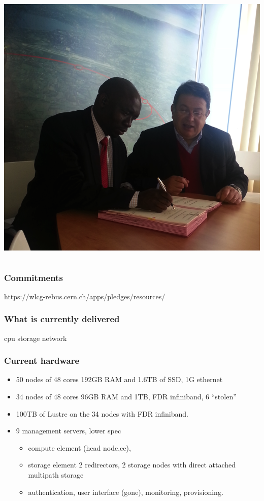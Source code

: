 \documentclass{beamer}
\begin{document}
\begin{frame}
\begin{columns}[T]
\begin{column}{.48\textwidth}
{\includegraphics[scale=0.45]{WLCG-MOU_Signing.pdf}
} 
\end{column}%
\end{columns}  
\end{frame}

\begin{frame}
\frametitle{Commitments}
https://wlcg-rebus.cern.ch/apps/pledges/resources/
\end{frame}

\begin{frame}
\frametitle{What is currently delivered}

cpu
storage
network
\end{frame}

\begin{frame}
  \frametitle{Current hardware}
  \begin{itemize}
    \item 50 nodes of 48 cores 192GB RAM and 1.6TB of SSD, 1G ethernet
    \item 34 nodes of 48 cores 96GB RAM and 1TB, FDR infiniband, 6 ``stolen''
    \item 100TB of Lustre on the 34 nodes with FDR infiniband.
    \item 9 management servers, lower spec 
  \begin{itemize}
    \item compute element (head node,ce),
    \item storage element 2 redirectors, 2 storage nodes with direct attached multipath storage
    \item authentication, user interface (gone), monitoring, provisioning. 
  \end{itemize}
  \end{itemize}
\end{frame}
\end{document}
